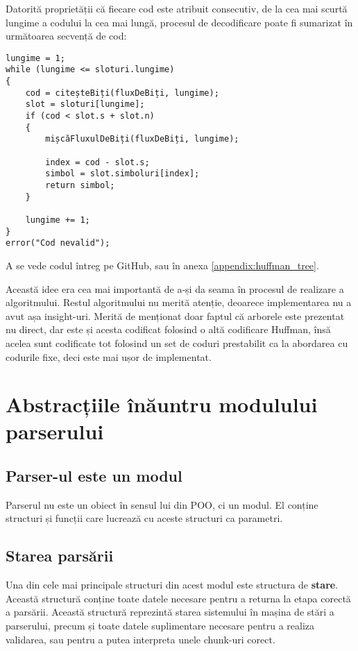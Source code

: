 \documentclass[a4paper,12pt]{report}
\begin{document}
Datorită proprietății că fiecare cod este atribuit consecutiv,
de la cea mai scurtă lungime a codului la cea mai lungă,
procesul de decodificare poate fi sumarizat în următoarea secvență de cod:

\begin{verbatim}
lungime = 1;
while (lungime <= sloturi.lungime)
{
    cod = citeșteBiți(fluxDeBiți, lungime);
    slot = sloturi[lungime];
    if (cod < slot.s + slot.n)
    {
        mișcăFluxulDeBiți(fluxDeBiți, lungime);

        index = cod - slot.s;
        simbol = slot.simboluri[index];
        return simbol;
    }

    lungime += 1;
}
error("Cod nevalid");
\end{verbatim}

A se vede codul întreg pe GitHub, sau în anexa \ref{appendix:huffman_tree}.

Această idee era cea mai importantă de a-și da seama în procesul de realizare a algoritmului.
Restul algoritmului nu merită atenție, deoarece implementarea nu a avut așa insight-uri.
Merită de menționat doar faptul că arborele este prezentat nu direct,
dar este și acesta codificat folosind o altă codificare Huffman,
însă acelea sunt codificate tot folosind un set de coduri prestabilit
ca la abordarea cu codurile fixe, deci este mai ușor de implementat.


\section{Abstracțiile înăuntru modulului parserului}

\subsection{Parser-ul este un modul}

Parserul nu este un obiect în sensul lui din \ac{POO}, ci un modul.
El conține structuri și funcții care lucrează cu aceste structuri ca parametri.

\subsection{Starea parsării}

Una din cele mai principale structuri din acest modul este structura de \textbf{stare}.
Această structură conține toate datele necesare pentru a returna la etapa corectă a parsării.
Această structură reprezintă starea sistemului în mașina de stări a parserului,
precum și toate datele suplimentare necesare pentru a realiza validarea,
sau pentru a putea interpreta unele chunk-uri corect.
\end{document}
